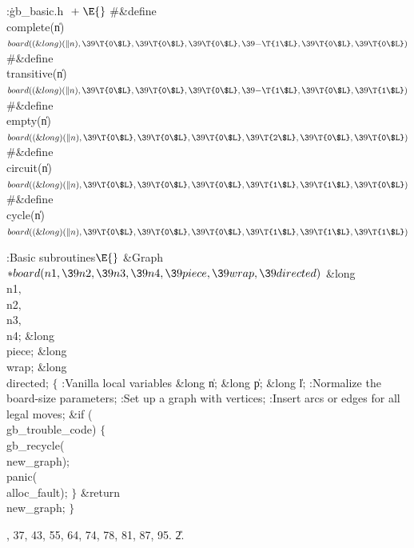 \Y\B\4:\.{gb\_basic.h }\X${}\mathrel+\E{}$\6
\8\#\&{define} \\{complete}(\|n)\5${}\\{board}((\&{long})(\|n),\39\T{0\$L},\39%
\T{0\$L},\39\T{0\$L},\39{-}\T{1\$L},\39\T{0\$L},\39\T{0\$L}){}$\6
\8\#\&{define} \\{transitive}(\|n)\5${}\\{board}((\&{long})(\|n),\39\T{0\$L},%
\39\T{0\$L},\39\T{0\$L},\39{-}\T{1\$L},\39\T{0\$L},\39\T{1\$L}){}$\6
\8\#\&{define} \\{empty}(\|n)\5${}\\{board}((\&{long})(\|n),\39\T{0\$L},\39\T{0%
\$L},\39\T{0\$L},\39\T{2\$L},\39\T{0\$L},\39\T{0\$L}){}$\6
\8\#\&{define} \\{circuit}(\|n)\5${}\\{board}((\&{long})(\|n),\39\T{0\$L},\39%
\T{0\$L},\39\T{0\$L},\39\T{1\$L},\39\T{1\$L},\39\T{0\$L}){}$\6
\8\#\&{define} \\{cycle}(\|n)\5${}\\{board}((\&{long})(\|n),\39\T{0\$L},\39\T{0%
\$L},\39\T{0\$L},\39\T{1\$L},\39\T{1\$L},\39\T{1\$L}){}$\par
\fi

\B{}:Basic subroutines\X${}\E{}$\6
\1\1\&{Graph} ${}{*}\\{board}(\\{n1},\39\\{n2},\39\\{n3},\39\\{n4},\39%
\\{piece},\39\\{wrap},\39\\{directed}){}$\6
\&{long} \\{n1}${},{}$ \\{n2}${},{}$ \\{n3}${},{}$ \\{n4};\6
\&{long} \\{piece};\6
\&{long} \\{wrap};\6
\&{long} \\{directed};\2\2\6
${}\{{}$\5
\1:Vanilla local variables\X\5
\hbox{}\6{}\&{long} \|n;\6
\&{long} \|p;\6
\&{long} \|l;\7
:Normalize the board-size parameters\X;\6
:Set up a graph with  vertices\X;\6
:Insert arcs or edges for all legal moves\X;\6
\&{if} (\\{gb\_trouble\_code})\5
${}\{{}$\1\6
\\{gb\_recycle}(\\{new\_graph});\6
\\{panic}(\\{alloc\_fault});\6
\4${}\}{}$\2\6
\&{return} \\{new\_graph};\6
\4${}\}{}$\2\par
{}, 37, 43, 55, 64, 74, 78, 81, 87, 95.
\U2.\fi

